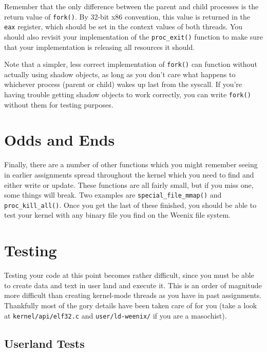 Remember that the only difference between the parent and child processes is the return value of \texttt{fork()}. By 32-bit x86 convention, this value is returned in the \texttt{eax} register, which should be set in the context values of both threads. You should also revisit your implementation of the \texttt{proc\_exit()} function to make sure that your implementation is releasing all resources it should.

Note that a simpler, less correct implementation of \texttt{fork()} can function without actually using shadow objects, as long as you don't care what happens to whichever process (parent or child) wakes up last from the syscall. If you're having trouble getting shadow objects to work correctly, you can write \texttt{fork()} without them for testing purposes.

\section{Odds and Ends}

Finally, there are a number of other functions which you might remember seeing in earlier assignments spread throughout the kernel which you need to find and either write or update. These functions are all fairly small, but if you miss one, some things will break. Two examples are \texttt{special\_file\_mmap()} and \texttt{proc\_kill\_all()}. Once you get the last of these finished, you should be able to test your kernel with any binary file you find on the Weenix file system.

\section{Testing}

Testing your code at this point becomes rather difficult, since you must be able to create data and text in user land and execute it. This is an order of magnitude more difficult than creating kernel-mode threads as you have in past assignments. Thankfully most of the gory details have been taken care of for you (take a look at \texttt{kernel/api/elf32.c} and \texttt{user/ld-weenix/} if you are a masochist).

\subsection{Userland Tests}

